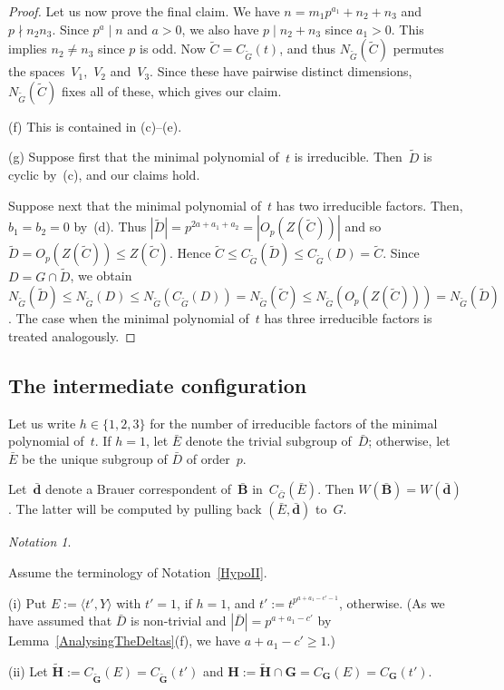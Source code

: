 \documentclass[12pt]{amsart}
\newcommand{\bG}{{\mathbf{G}}}      %
\newcommand{\bB}{{\mathbf{B}}}
\newcommand{\bH}{{\mathbf{H}}}
\newcommand{\bd}{{\mathbf{d}}}
\theoremstyle{theorem}
\theoremstyle{definition}
\theoremstyle{remark}
\newtheorem{notn}[thm]{Notation}
\begin{document}
\begin{proof}
Let us now prove the final claim. We have $n = m_1p^{a_1} + n_2 + n_3$ and
$p \nmid n_2n_3$. Since $p^a \mid n$ and $a > 0$, we also have 
$p \mid n_2 + n_3$ since $a_1 > 0$. This implies $n_2 \neq n_3$ since $p$ is odd.
Now $\tilde{C} = C_{\tilde{G}}( t )$, and thus $N_{\tilde{G}}( \tilde{C} )$ 
permutes the spaces~$V_1$,~$V_2$ and~$V_3$. Since these have pairwise distinct
dimensions, $N_{\tilde{G}}( \tilde{C} )$ fixes all of these, which gives our 
claim.

(f) This is contained in (c)--(e).

(g) Suppose first that the minimal polynomial of~$t$ is irreducible. 
Then~$\tilde{D}$ is cyclic by~(c), and our claims hold.

Suppose next that the minimal polynomial of~$t$ has two irreducible 
factors. Then, $b_1 = b_2 = 0$ by~(d). Thus $|\tilde{D}| = p^{2a + a_1 + a_2}
= |O_p( Z( \tilde{C} ) )|$ and so $\tilde{D} = O_p( Z( \tilde{C} ) ) 
\leq Z( \tilde{C} )$. Hence 
$\tilde{C} \leq C_{\tilde{G}}( \tilde{D} )
\leq C_{\tilde{G}}( D ) = \tilde{C}$. Since $D = G \cap \tilde{D}$, we obtain
$N_{\tilde{G}}( \tilde{D} ) \leq N_{\tilde{G}}( D ) \leq 
N_{\tilde{G}}( C_{\tilde{G}}( D ) ) = N_{\tilde{G}}( \tilde{C} ) \leq
N_{\tilde{G}}( O_p( Z( \tilde{C} ) ) ) = N_{\tilde{G}}( \tilde{D} )$. 
The case when the minimal polynomial of~$t$ has three irreducible
factors is treated analogously.
\end{proof}

\addtocounter{subsection}{4}
\subsection{The intermediate configuration}
\label{IntermediateConfiguration}
Let us write $h \in \{ 1, 2, 3 \}$ for the number of irreducible factors of the
minimal polynomial of~$t$. If $h = 1$, let $\bar{E}$ denote the trivial subgroup
of~$\bar{D}$; otherwise, let~$\bar{E}$ be the unique subgroup of $\bar{D}$ of 
order~$p$.

Let~$\bar{\bd}$ denote a Brauer correspondent of~$\bar{\bB}$ 
in~$C_{\bar{G}}( \bar{E} )$. Then $W( \bar{\bB} ) = W( \bar{\bd} )$. The latter 
will be computed by pulling back $(\bar{E},\bar{\bd})$ to~$G$.

\addtocounter{thm}{1}
\begin{notn}
\label{HypoV}
{\rm
Assume the terminology of Notation~\ref{HypoII}. 

(i) Put $E := \langle t', Y \rangle$ with $t' = 1$, if $h = 1$, 
and $t' := t^{p^{a+a_1-c'-1}}$, otherwise. (As we have assumed that $\bar{D}$
is non-trivial and $|\bar{D}| = p^{a+a_1-c'}$ by 
Lemma~\ref{AnalysingTheDeltas}(f), we have $a+a_1-c' \geq 1$.)

(ii) Let $\tilde{\bH} := C_{\tilde{\bG}}( E ) = C_{\tilde{\bG}}( t' )$ and 
$\bH := \tilde{\bH} \cap \bG = C_{\bG}( E ) = C_{\bG}( t' )$.
}\hfill{\textsquare}
\end{notn}
\end{document}
